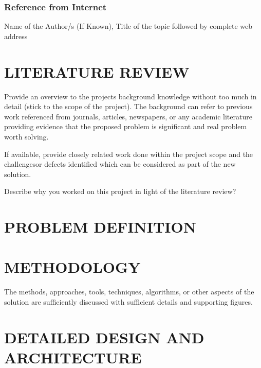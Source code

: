 \documentclass[12pt, a4paper]{report}
\begin{document}
\subsection{Reference from Internet}
Name of the Author/s (If Known), Title of the topic followed by complete web address

\chapter{LITERATURE REVIEW}
Provide an overview to the projects background knowledge without too much in detail (stick to the scope of the project). The background can refer to previous work referenced from journals, articles, newspapers, or any academic literature providing evidence that the proposed problem is significant and real problem worth solving.

If available, provide closely related work done within the project scope and the challengesor defects identified which can be considered as part of the new solution.

Describe why you worked on this project in light of the literature review?
\chapter{PROBLEM DEFINITION}

\chapter{METHODOLOGY}
The methods, approaches, tools, techniques, algorithms, or other aspects of the solution are sufficiently discussed with sufficient details and supporting figures.

\chapter{DETAILED DESIGN AND ARCHITECTURE}
\end{document}
